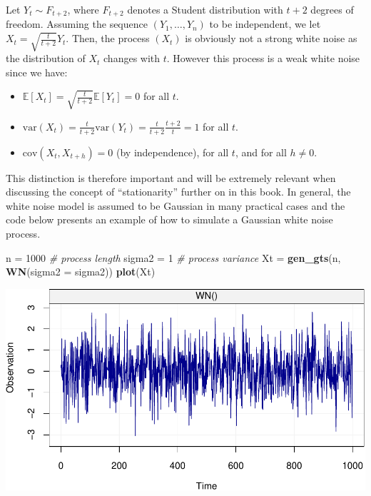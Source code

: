 \documentclass[]{book}
\newenvironment{Shaded}{\begin{snugshade}}{\end{snugshade}}
\newcommand{\CommentTok}[1]{\textcolor[rgb]{0.56,0.35,0.01}{\textit{#1}}}
\newcommand{\DataTypeTok}[1]{\textcolor[rgb]{0.13,0.29,0.53}{#1}}
\newcommand{\DecValTok}[1]{\textcolor[rgb]{0.00,0.00,0.81}{#1}}
\newcommand{\KeywordTok}[1]{\textcolor[rgb]{0.13,0.29,0.53}{\textbf{#1}}}
\newcommand{\NormalTok}[1]{#1}
\newcommand{\StringTok}[1]{\textcolor[rgb]{0.31,0.60,0.02}{#1}}
\providecommand{\tightlist}{%
  \setlength{\itemsep}{0pt}\setlength{\parskip}{0pt}}
\theoremstyle{definition}
\theoremstyle{definition}
\theoremstyle{definition}
\theoremstyle{remark}
\let\BeginKnitrBlock\begin \let\EndKnitrBlock\end
\begin{document}
\BeginKnitrBlock{example}
\protect\hypertarget{exm:weaknotstrong}{}{\label{exm:weaknotstrong} } Let
\(Y_t \mathop \sim F_{t+2}\), where \(F_{t+2}\) denotes a Student
distribution with \(t+2\) degrees of freedom. Assuming the sequence
\((Y_1, \ldots, Y_n)\) to be independent, we let
\(X_t = \sqrt{\frac{t}{t+2}} Y_t\). Then, the process \((X_t)\) is
obviously not a strong white noise as the distribution of \(X_t\)
changes with \(t\). However this process is a weak white noise since we
have:

\begin{itemize}
\tightlist
\item
  \(\mathbb{E}[X_t] = \sqrt{\frac{t}{t+2}} \mathbb{E}[Y_t] = 0\) for all
  \(t\).
\item
  \(\text{var}(X_t) = \frac{t}{t+2} \text{var}(Y_t) = \frac{t}{t+2} \frac{t+2}{t} = 1\)
  for all \(t\).
\item
  \(\text{cov}(X_t, X_{t+h}) = 0\) (by independence), for all \(t\), and
  for all \(h \neq 0\).
\end{itemize}
\EndKnitrBlock{example}

This distinction is therefore important and will be extremely relevant
when discussing the concept of ``stationarity'' further on in this book.
In general, the white noise model is assumed to be Gaussian in many
practical cases and the code below presents an example of how to
simulate a Gaussian white noise process.

\begin{Shaded}
\begin{Highlighting}[]
\NormalTok{n =}\StringTok{ }\DecValTok{1000}                               \CommentTok{# process length}
\NormalTok{sigma2 =}\StringTok{ }\DecValTok{1}                             \CommentTok{# process variance}
\NormalTok{Xt =}\StringTok{ }\KeywordTok{gen_gts}\NormalTok{(n, }\KeywordTok{WN}\NormalTok{(}\DataTypeTok{sigma2 =}\NormalTok{ sigma2))}
\KeywordTok{plot}\NormalTok{(Xt)}
\end{Highlighting}
\end{Shaded}

\includegraphics{ts_files/figure-latex/example_WN-1.pdf}
\end{document}
